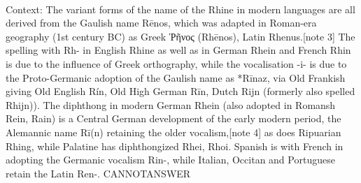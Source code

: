 \documentclass[11pt,a4paper, onecolumn]{article}
\begin{document}
\\ Context: The variant forms of the name of the Rhine in modern languages are all derived from the Gaulish name Rēnos, which was adapted in Roman-era geography (1st century BC) as Greek Ῥῆνος (Rhēnos), Latin Rhenus.[note 3] The spelling with Rh- in English Rhine as well as in German Rhein and French Rhin is due to the influence of Greek orthography, while the vocalisation -i- is due to the Proto-Germanic adoption of the Gaulish name as *Rīnaz, via Old Frankish giving Old English Rín, Old High German Rīn, Dutch Rijn (formerly also spelled Rhijn)). The diphthong in modern German Rhein (also adopted in Romansh Rein, Rain) is a Central German development of the early modern period, the Alemannic name Rī(n) retaining the older vocalism,[note 4] as does Ripuarian Rhing, while Palatine has diphthongized Rhei, Rhoi. Spanish is with French in adopting the Germanic vocalism Rin-, while Italian, Occitan and Portuguese retain the Latin Ren-. CANNOTANSWER
\end{document}
